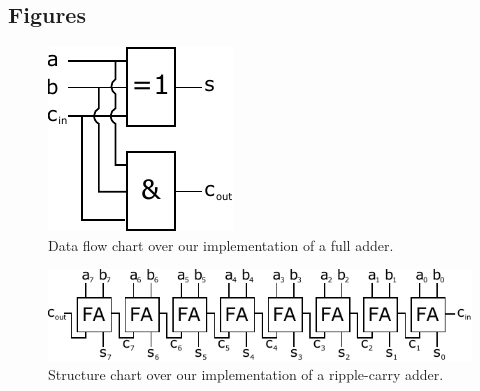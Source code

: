 \documentclass[a4,11pt]{article}
\begin{document}
\newpage
\begin{appendix}

\section{Figures}
\label{app:fig}
\begin{figure}[h!]
 	\centering
	\includegraphics[width=0.3\columnwidth]{Figurer/fa}
  	\caption{Data flow chart over our implementation of a full adder.}
  	\label{fig:fa}
\end{figure}

\begin{figure}[h!]
 	\centering
	\includegraphics[width=1\columnwidth]{Figurer/rca}
  	\caption{Structure chart over our implementation of a ripple-carry adder.}
  	\label{fig:rca}
\end{figure}
\end{appendix}
\end{document}
